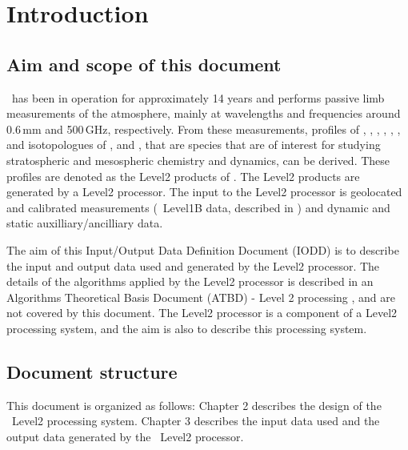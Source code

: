 \chapter{Introduction}
\label{chapter:introduction}


\setcounter{page}{1}


\section{Aim and scope of this document}
\label{sec:aim}

\smr\ has been in operation for approximately 14 years and 
performs passive limb measurements of the atmosphere,
mainly at wavelengths and frequencies around 0.6\,mm and 500\,GHz,
respectively.
From these measurements, profiles of 
, , , , 
, , and isotopologues of , and ,
that are species that are of interest for studying stratospheric and 
mesospheric chemistry and dynamics, can be derived. 
These profiles are denoted as the Level2 products of \smr.  
The Level2 products are generated by a Level2 processor.
The input to the Level2 processor is geolocated and calibrated
measurements (\smr\ Level1B data, described in \citet{atbdl1b}) 
and dynamic and static auxilliary/ancilliary data. 

The aim of this Input/Output Data Definition Document (IODD) is to describe
the input and output data used and generated by the Level2 processor.
The details of the algorithms applied by the Level2 processor
is described in an Algorithms Theoretical Basis Document (ATBD) - 
Level 2 processing \citep{atbdl2}, and are not covered by this document.
The Level2 processor is a component of a Level2 processing system,
and the aim is also to describe this processing system.

\section{Document structure}

This document is organized as follows:
Chapter 2 describes the design of the \smr\ Level2 processing system. 
Chapter 3 describes the input data used and the output data generated 
by the \smr\ Level2 processor.


